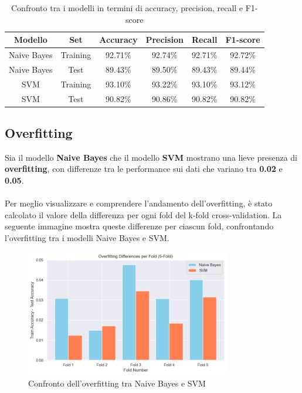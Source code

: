\begin{table}[H]
    \centering
    \begin{tabular}{|c|c|c|c|c|c|}
        \hline
        \textbf{Modello} & \textbf{Set} & \textbf{Accuracy} & \textbf{Precision} & \textbf{Recall} & \textbf{F1-score} \\
        \hline
        Naive Bayes & Training & 92.71\% & 92.74\% & 92.71\% & 92.72\% \\
        \hline
        Naive Bayes & Test & 89.43\% & 89.50\% & 89.43\% & 89.44\% \\
        \hline
        SVM & Training & 93.10\% & 93.22\% & 93.10\% & 93.12\% \\
        \hline
        SVM & Test & 90.82\% & 90.86\% & 90.82\% & 90.82\% \\
        \hline
    \end{tabular}
    \caption{Confronto tra i modelli in termini di accuracy, precision, recall e F1-score}
    \label{tab:confronto_metriche}
\end{table}


\subsection{Overfitting}

Sia il modello \textbf{Naive Bayes} che il modello \textbf{SVM} mostrano una lieve presenza di \textbf{overfitting}, con differenze tra le performance sui dati che variano tra \textbf{0.02} e \textbf{0.05}. \\ \\
Per meglio visualizzare e comprendere l'andamento dell'overfitting, è stato calcolato il valore della differenza per ogni fold del k-fold cross-validation. La seguente immagine mostra queste differenze per ciascun fold, confrontando l'overfitting tra i modelli Naive Bayes e SVM.

\begin{figure}[H]
    \centering
    \includegraphics[width=0.8\textwidth]{images/overfitting_differences.png}
    \caption{Confronto dell'overfitting tra Naive Bayes e SVM}
    \label{fig:overfitting_differences}
\end{figure}

